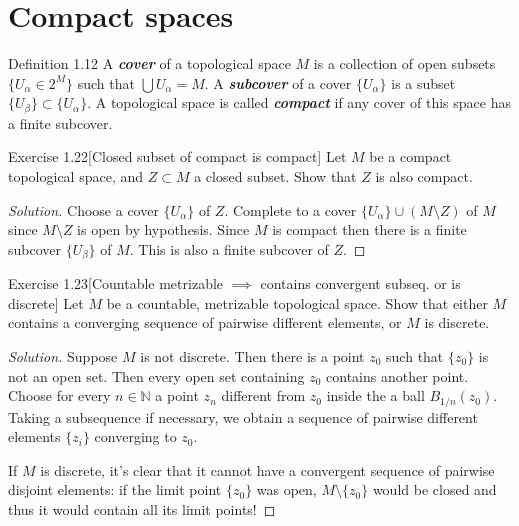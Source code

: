\section{Compact spaces}

\begin{thing3}{Definition 1.12}\leavevmode
	A \textit{\textbf{cover}} of a topological space $M$ is a collection of open subsets $\{U_\alpha \in 2^M\}$ such that $\bigcup U_\alpha=M $. A \textit{\textbf{subcover}} of a cover $\{U_\alpha\}$ is a subset $\{U_\beta\}\subset \{U_\alpha\}$. A topological space is called \textit{\textbf{compact}} if any cover of this space has a finite subcover.
\end{thing3}

\begin{thing4}{Exercise 1.22}[Closed subset of compact is compact]\label{exer:1.22}\leavevmode
	Let $M$ be a compact topological space, and $Z \subset M$ a closed subset. Show that $Z$ is also compact.
\end{thing4}

\begin{proof}[Solution]\leavevmode
Choose a cover $\{U_\alpha\}$ of $Z$. Complete to a cover $\{U_\alpha\}\cup (M\setminus Z)$ of $M$ since $M\setminus Z$ is open by hypothesis. Since $M$ is compact then there is a finite subcover $\{U_\beta\}$ of $M$. This is also a finite subcover of $Z$.
\end{proof}

\begin{thing4}{Exercise 1.23}[Countable metrizable $\implies $ contains convergent subseq. or is discrete]\label{exer:1.23}\leavevmode
	Let $M$ be a countable, metrizable topological space. Show that either $M$ contains a converging sequence of pairwise different elements, or $M$ is discrete.
\end{thing4}

\begin{proof}[Solution]\leavevmode
Suppose $M$ is not discrete. Then there is a point $z_0$ such that $\{z_0\}$ is not an open set. Then every open set containing $z_0$ contains another point. Choose for every $n \in \mathbb{N}$ a point $z_n$ different from $z_0$ inside the a ball $B_{1/n}(z_0)$. Taking a subsequence if necessary, we obtain a sequence of pairwise different elements $\{z_i\}$ converging to $z_0$.

If $M$ is discrete, it's clear that it cannot have a convergent sequence of pairwise disjoint elements: if the limit point $\{z_0\}$ was open,  $M\setminus \{z_0\}$ would be closed and thus it would contain all its limit points!
\end{proof}

